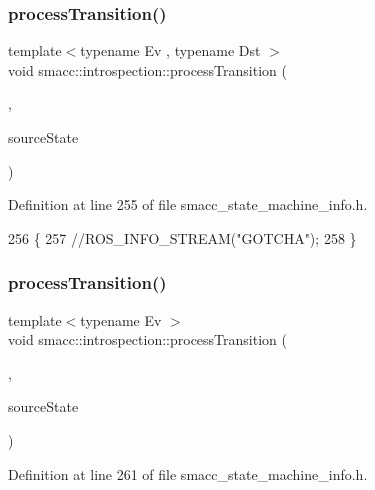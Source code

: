 \subsubsection{\texorpdfstring{process\+Transition()}{processTransition()}\hspace{0.1cm}{\footnotesize\ttfamily [3/4]}}
{\footnotesize\ttfamily template$<$typename Ev , typename Dst $>$ \\
void smacc\+::introspection\+::process\+Transition (\begin{DoxyParamCaption}\item[{statechart\+::transition$<$ Ev, Dst $>$ $\ast$}]{,  }\item[{std\+::shared\+\_\+ptr$<$ \hyperlink{classsmacc_1_1introspection_1_1SmaccStateInfo}{Smacc\+State\+Info} $>$ \&}]{source\+State }\end{DoxyParamCaption})}



Definition at line 255 of file smacc\+\_\+state\+\_\+machine\+\_\+info.\+h.


\begin{DoxyCode}
256 \{
257     \textcolor{comment}{//ROS\_INFO\_STREAM("GOTCHA");}
258 \}
\end{DoxyCode}
\mbox{\label{namespacesmacc_1_1introspection_a25f60bf498ae9f3d0324ed1b84ecbae4}} 
\subsubsection{\texorpdfstring{process\+Transition()}{processTransition()}\hspace{0.1cm}{\footnotesize\ttfamily [4/4]}}
{\footnotesize\ttfamily template$<$typename Ev $>$ \\
void smacc\+::introspection\+::process\+Transition (\begin{DoxyParamCaption}\item[{statechart\+::custom\+\_\+reaction$<$ Ev $>$ $\ast$}]{,  }\item[{std\+::shared\+\_\+ptr$<$ \hyperlink{classsmacc_1_1introspection_1_1SmaccStateInfo}{Smacc\+State\+Info} $>$ \&}]{source\+State }\end{DoxyParamCaption})}



Definition at line 261 of file smacc\+\_\+state\+\_\+machine\+\_\+info.\+h.



